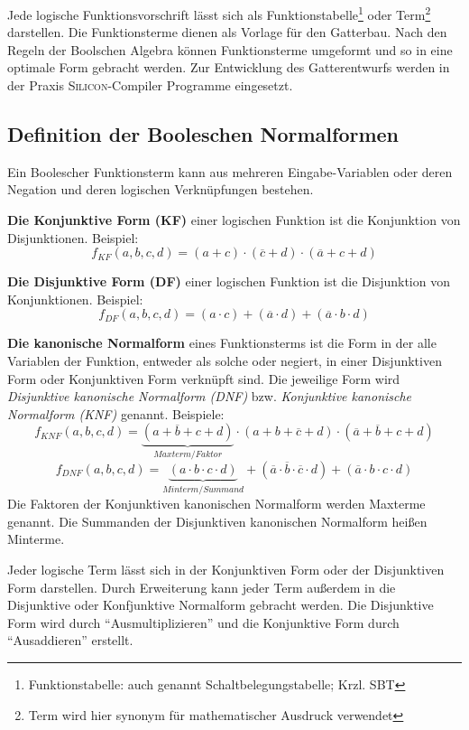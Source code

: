 Jede logische Funktionsvorschrift lässt sich als Funktionstabelle\footnote{Funktionstabelle: auch genannt Schaltbelegungstabelle; Krzl. SBT} oder Term\footnote{Term wird hier synonym für mathematischer Ausdruck verwendet} darstellen. Die Funktionsterme dienen als Vorlage für den Gatterbau. Nach den Regeln der Boolschen Algebra können Funktionsterme umgeformt und so in eine optimale Form gebracht werden. Zur Entwicklung des Gatterentwurfs werden in der Praxis \textsc{Silicon}-Compiler Programme eingesetzt.

\subsection{Definition der Booleschen Normalformen}
Ein Boolescher Funktionsterm kann aus mehreren Eingabe-Variablen oder deren Negation und deren logischen Verknüpfungen bestehen.

\textbf{Die Konjunktive Form (KF)} einer logischen Funktion ist die Konjunktion von Disjunktionen. Beispiel:
$$ f_{\textit{KF}}(a,b,c,d) = (a + c) \cdot (\overline{c} + d)
	\cdot (\overline{a} + c + d) $$

\textbf{Die Disjunktive Form (DF)} einer logischen Funktion ist die Disjunktion von Konjunktionen. Beispiel:
$$ f_{\textit{DF}}(a,b,c,d) = (a \cdot c) + (\overline{a} \cdot d)
	+ (\overline{a} \cdot b \cdot d) $$

\textbf{Die kanonische Normalform} eines Funktionsterms ist die Form in der alle Variablen der Funktion, entweder als solche oder negiert, in einer Disjunktiven Form oder Konjunktiven Form verknüpft sind. Die jeweilige Form wird \textsl{Disjunktive kanonische Normalform (DNF)} bzw. \textsl{Konjunktive kanonische Normalform (KNF)} genannt. Beispiele:
$$ f_{\textit{KNF}}(a,b,c,d) = 
	\underbrace{(a + \overline{b} + c + d)}_{Maxterm / Faktor}
	\cdot (a + b +\overline{c} + d) 
	\cdot (\overline{a} + \overline{b} + c + d) $$
$$ f_{\textit{DNF}}(a,b,c,d) = 
	\underbrace{(a \cdot b \cdot c \cdot d)}_{Minterm / Summand}
	+ (\overline{a} \cdot \overline{b} \cdot \overline{c} \cdot d)
	+ (\overline{a} \cdot b \cdot c \cdot d) $$
Die Faktoren der Konjunktiven kanonischen Normalform werden Maxterme genannt. Die Summanden der Disjunktiven kanonischen Normalform heißen Minterme.

Jeder logische Term lässt sich in der Konjunktiven Form oder der Disjunktiven Form darstellen. Durch Erweiterung kann jeder Term außerdem in die Disjunktive oder Konfjunktive Normalform gebracht werden. Die Disjunktive Form wird durch "`Ausmultiplizieren"' und die Konjunktive Form durch "`Ausaddieren"' erstellt.

